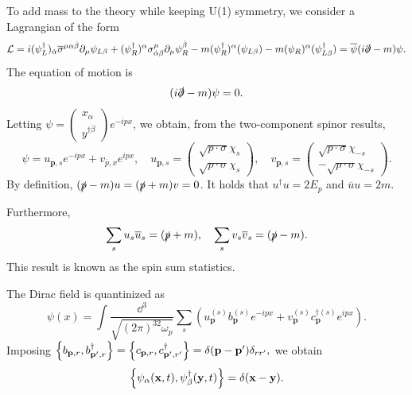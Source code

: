 \documentclass{article}
\begin{document}
To add mass to the theory while keeping U(1) symmetry, we consider a Lagrangian of the form 
\begin{equation}
    \mathcal L=i(\psi^\dag_L)_{\dot\alpha}\overline\sigma^{\mu\alpha\dot\beta}\partial_\mu\psi_{L\beta}+(\psi^\dag_R)^\alpha\sigma^\mu_{\dot\alpha\beta}\partial_\mu\psi^{\dot\beta}_R-m(\psi^\dag_R)^\alpha(\psi_{L\beta})-m(\psi_R)^\alpha(\psi^\dag_{L\beta})=\overline\psi(i\slashed\partial-m)\psi.
\end{equation}
The equation of motion is 
\begin{equation}
    (i\slashed\partial-m)\psi=0.
\end{equation}
Letting $\psi=\begin{pmatrix}x_\alpha\\y^{\dag\dot\beta}\end{pmatrix}e^{-ipx}$, we obtain, from the two-component spinor results, 
\begin{equation}
    \psi=u_{\mathbf p,s}e^{-ipx}+v_{\overline p,x}e^{ipx},\quad u_{\mathbf p,s}=\begin{pmatrix}\sqrt{p\cdot\sigma}\chi_s\\\sqrt{p\cdot\sigma}\chi_s\end{pmatrix},\quad v_{\mathbf p,s}=\begin{pmatrix}\sqrt{p\cdot\sigma}\chi_{-s}\\-\sqrt{p\cdot\sigma}\chi_{-s}\end{pmatrix}.
\end{equation}
By definition, $(\slashed p-m)u=(\slashed p+m)v=0$. It holds that $u^\dag u=2E_p$ and $\overline uu=2m$.

Furthermore, 
\begin{equation}
    \sum_su_s\overline u_s=(\slashed p+m),\quad\sum_sv_s\overline v_s=(\slashed p-m).
\end{equation}
This result is known as the spin sum statistics.

The Dirac field is quantinized as 
\begin{equation}
    \psi(x)=\int\frac{\dd^3}{\sqrt{(2\pi)^32\omega_p}}\sum_s\left(u^{(s)}_{\mathbf p}b^{(s)}_{\mathbf p}e^{-ipx}+v^{(s)}_{\mathbf p}c^{\dag(s)}_{\mathbf p}e^{ipx}\right).
\end{equation}
Imposing $\acomm{b_{\mathbf p,r}}{b^\dag_{\mathbf p',r}}=\acomm{c_{\mathbf p,r}}{c^\dag_{\mathbf p',r'}}=\delta(\mathbf p-\mathbf p')\delta_{rr'},$ we obtain
\begin{equation}
    \acomm{\psi_\alpha(\mathbf x,t)}{\psi^\dag_\beta(\mathbf y,t)}=\delta(\mathbf x-\mathbf y).
\end{equation}
\end{document}
